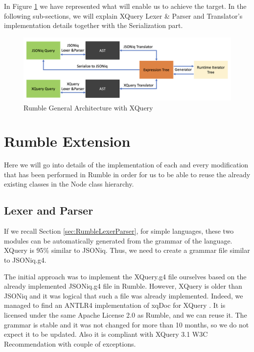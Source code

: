 In Figure \ref{fig:Rumble_General_Architecture_With_XQuery} we have represented what will enable us to achieve the target. In the following sub-sections, we will explain XQuery Lexer \& Parser and Translator's implementation details together with the Serialization part. 

\begin{figure}[h!]
	\includegraphics[width=\linewidth]{double_parsing_architecture.png}
	\vspace*{-5mm}
	\caption{Rumble General Architecture with XQuery}
	\label{fig:Rumble_General_Architecture_With_XQuery}
\end{figure}

\section{Rumble Extension}
Here we will go into details of the implementation of each and every modification that has been performed in Rumble in order for us to be able to reuse the already existing classes in the Node class hierarchy. 

\subsection{Lexer and Parser}
If we recall Section \ref{sec:RumbleLexerParser}, for simple languages, these two modules can be automatically generated from the grammar of the language. XQuery is 95\% similar to JSONiq. Thus, we need to create a grammar file similar to JSONiq.g4. 

The initial approach was to implement the XQuery.g4 file ourselves based on the already implemented JSONiq.g4 file in Rumble. However, XQuery is older than JSONiq and it was logical that such a file was already implemented. Indeed, we managed to find an ANTLR4 implementation of xqDoc for XQuery \cite{XqueryGrammar}. It is licensed under the same Apache License 2.0 as Rumble, and we can reuse it. The grammar is stable and it was not changed for more than 10 months, so we do not expect it to be updated. Also it is compliant with XQuery 3.1 W3C Recommendation \cite{XQueryRecommendation} with couple of exceptions. 

